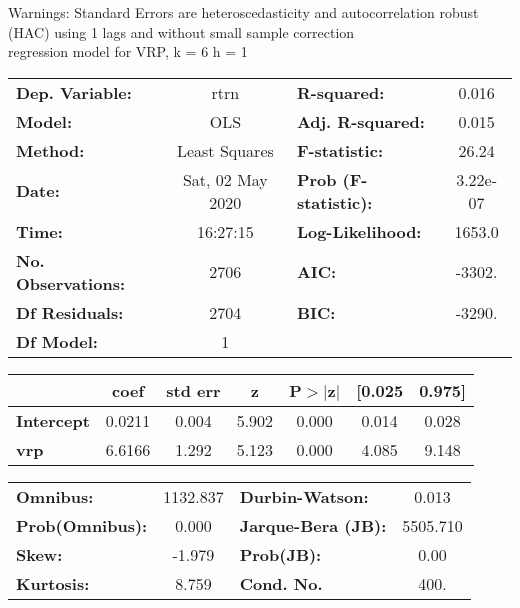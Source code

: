 Warnings: \newline
 [1] Standard Errors are heteroscedasticity and autocorrelation robust (HAC) using 1 lags and without small sample correction\\ 

regression model for VRP, k = 6 h = 1\begin{center}
\begin{tabular}{lclc}
\toprule
\textbf{Dep. Variable:}    &       rtrn       & \textbf{  R-squared:         } &     0.016   \\
\textbf{Model:}            &       OLS        & \textbf{  Adj. R-squared:    } &     0.015   \\
\textbf{Method:}           &  Least Squares   & \textbf{  F-statistic:       } &     26.24   \\
\textbf{Date:}             & Sat, 02 May 2020 & \textbf{  Prob (F-statistic):} &  3.22e-07   \\
\textbf{Time:}             &     16:27:15     & \textbf{  Log-Likelihood:    } &    1653.0   \\
\textbf{No. Observations:} &        2706      & \textbf{  AIC:               } &    -3302.   \\
\textbf{Df Residuals:}     &        2704      & \textbf{  BIC:               } &    -3290.   \\
\textbf{Df Model:}         &           1      & \textbf{                     } &             \\
\bottomrule
\end{tabular}
\begin{tabular}{lcccccc}
                   & \textbf{coef} & \textbf{std err} & \textbf{z} & \textbf{P$> |$z$|$} & \textbf{[0.025} & \textbf{0.975]}  \\
\midrule
\textbf{Intercept} &       0.0211  &        0.004     &     5.902  &         0.000        &        0.014    &        0.028     \\
\textbf{vrp}       &       6.6166  &        1.292     &     5.123  &         0.000        &        4.085    &        9.148     \\
\bottomrule
\end{tabular}
\begin{tabular}{lclc}
\textbf{Omnibus:}       & 1132.837 & \textbf{  Durbin-Watson:     } &    0.013  \\
\textbf{Prob(Omnibus):} &   0.000  & \textbf{  Jarque-Bera (JB):  } & 5505.710  \\
\textbf{Skew:}          &  -1.979  & \textbf{  Prob(JB):          } &     0.00  \\
\textbf{Kurtosis:}      &   8.759  & \textbf{  Cond. No.          } &     400.  \\
\bottomrule
\end{tabular}
\end{center}

